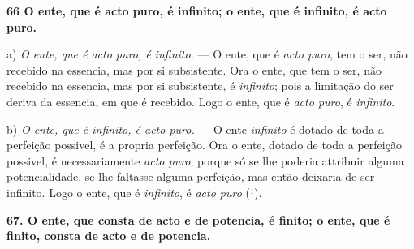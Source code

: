  \textbf{66 O ente, que é acto puro, é infinito; o ente, que é infinito, é acto puro.}

a) \emph{O ente, que é acto puro, é infinito.} --- O ente, que é \emph{acto puro}, tem o ser, não recebido na essencia, mas por si subsistente. Ora o ente, que tem o ser, não recebido na essencia, mas por si subsistente, é \emph{infinito}; pois a limitação do ser deriva da essencia, em que é recebido. Logo o ente, que é \emph{acto puro}, é \emph{infinito}.

b) \emph{O ente, que é infinito, é acto puro.} --- O ente \emph{infinito} é dotado de toda a perfeição possivel, é a propria perfeição. Ora o ente, dotado de toda a perfeição possivel, é necessariamente \emph{acto puro}; porque só se lhe poderia attribuir alguma potencialidade, se lhe faltasse alguma perfeição, mas então deixaria de ser infinito. Logo o ente, que é \emph{infinito}, é \emph{acto puro} (¹).

\textbf{67. O ente, que consta de acto e de potencia, é finito; o ente, que é finito, consta de acto e de potencia.}

